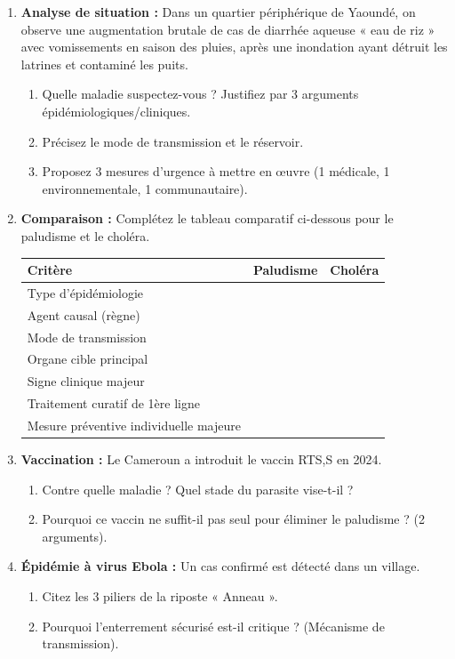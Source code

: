 \documentclass[11pt]{article}
\begin{document}
\begin{exercice}
\begin{enumerate}
    \item \textbf{Analyse de situation :} Dans un quartier périphérique de Yaoundé, on observe une augmentation brutale de cas de diarrhée aqueuse « eau de riz » avec vomissements en saison des pluies, après une inondation ayant détruit les latrines et contaminé les puits.
    \begin{enumerate}
        \item Quelle maladie suspectez-vous ? Justifiez par 3 arguments épidémiologiques/cliniques.
        \item Précisez le mode de transmission et le réservoir.
        \item Proposez 3 mesures d'urgence à mettre en œuvre (1 médicale, 1 environnementale, 1 communautaire).
    \end{enumerate}
    \item \textbf{Comparaison :} Complétez le tableau comparatif ci-dessous pour le paludisme et le choléra.
    \begin{center}
    \begin{tabularx}{\linewidth}{|l|X|X|}\hline
    \textbf{Critère} & \textbf{Paludisme} & \textbf{Choléra} \\ \hline
    Type d'épidémiologie & & \\ \hline
    Agent causal (règne) & & \\ \hline
    Mode de transmission & & \\ \hline
    Organe cible principal & & \\ \hline
    Signe clinique majeur & & \\ \hline
    Traitement curatif de 1ère ligne & & \\ \hline
    Mesure préventive individuelle majeure & & \\ \hline
    \end{tabularx}
    \end{center}
    \item \textbf{Vaccination :} Le Cameroun a introduit le vaccin RTS,S en 2024.
    \begin{enumerate}
        \item Contre quelle maladie ? Quel stade du parasite vise-t-il ?
        \item Pourquoi ce vaccin ne suffit-il pas seul pour éliminer le paludisme ? (2 arguments).
    \end{enumerate}
    \item \textbf{Épidémie à virus Ebola :} Un cas confirmé est détecté dans un village.
    \begin{enumerate}
        \item Citez les 3 piliers de la riposte « Anneau ».
        \item Pourquoi l'enterrement sécurisé est-il critique ? (Mécanisme de transmission).
    \end{enumerate}
\end{enumerate}
\end{exercice}
\end{document}
